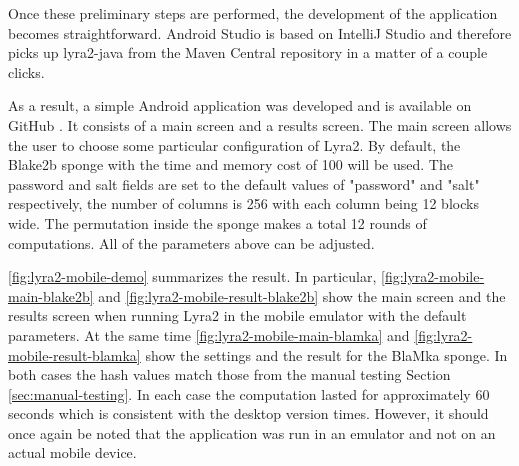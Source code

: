 Once these preliminary steps are performed, the development of the application becomes straightforward. Android Studio is based on IntelliJ Studio and therefore picks up lyra2-java from the Maven Central repository in a matter of a couple clicks.

As a result, a simple Android application was developed and is available on GitHub \cite{github:2017:lyra2-mobile}. It consists of a main screen and a results screen. The main screen allows the user to choose some particular configuration of Lyra2. By default, the Blake2b sponge with the time and memory cost of 100 will be used. The password and salt fields are set to the default values of "password" and "salt" respectively, the number of columns is 256 with each column being 12 blocks wide. The permutation inside the sponge makes a total 12 rounds of computations. All of the parameters above can be adjusted.

\autoref{fig:lyra2-mobile-demo} summarizes the result. In particular, \autoref{fig:lyra2-mobile-main-blake2b} and \autoref{fig:lyra2-mobile-result-blake2b} show the main screen and the results screen when running Lyra2 in the mobile emulator with the default parameters. At the same time \autoref{fig:lyra2-mobile-main-blamka} and \autoref{fig:lyra2-mobile-result-blamka} show the settings and the result for the BlaMka sponge. In both cases the hash values match those from the manual testing Section \ref{sec:manual-testing}. In each case the computation lasted for approximately 60 seconds which is consistent with the desktop version times. However, it should once again be noted that the application was run in an emulator and not on an actual mobile device.


